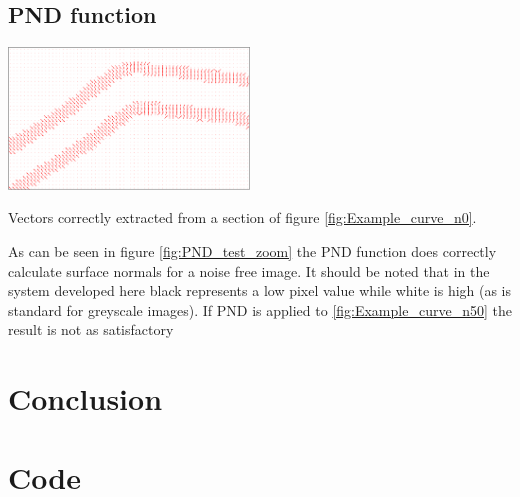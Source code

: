 \documentclass[11pt,a4paper]{article}
\makeatletter
\newenvironment{figurehere}
    {\def\@captype{figure}}
    {}
\makeatother
\begin{document}
\begin{multicols}{2}
	\subsection{PND function}
        \begin{figurehere}
        \centering
        \includegraphics[width = 0.48\textwidth]{PND_test_zoom}
        \caption{Vectors correctly extracted from a section of figure \ref{fig:Example_curve_n0}.}
        \label{fig:PND_test_zoom}
      \end{figurehere}

		As can be seen in figure \ref{fig:PND_test_zoom} the PND function does correctly calculate surface normals for a noise free image. It should be noted that in the system developed here black represents a low pixel value while white is high (as is standard for greyscale images). If PND is applied to \ref{fig:Example_curve_n50} the result is not as satisfactory

\section{Conclusion}


\printbibliography
\end{multicols}

\appendix
\section{Code}
	
\end{document}
